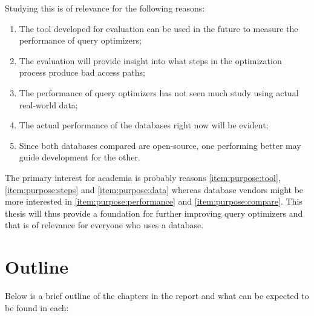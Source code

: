 Studying this is of relevance for the following reasons:
\begin{enumerate}
    \item\label{item:purpose:tool} The tool developed for evaluation can be used in the future to measure the performance of query optimizers;
    \item\label{item:purpose:steps} The evaluation will provide insight into what steps in the optimization process produce bad access paths;
    \item\label{item:purpose:data} The performance of query optimizers has not seen much study using actual real-world data;
    \item\label{item:purpose:performance} The actual performance of the databases right now will be evident;
    \item\label{item:purpose:compare} Since both databases compared are open-source, one performing better may guide development for the other.
\end{enumerate}

The primary interest for academia is probably reasons \ref{item:purpose:tool}, \ref{item:purpose:steps} and \ref{item:purpose:data} whereas database vendors might be more interested in \ref{item:purpose:performance} and \ref{item:purpose:compare}. This thesis will thus provide a foundation for further improving query optimizers and that is of relevance for everyone who uses a database.

\section{Outline}
Below is a brief outline of the chapters in the report and what can be expected to be found in each:

